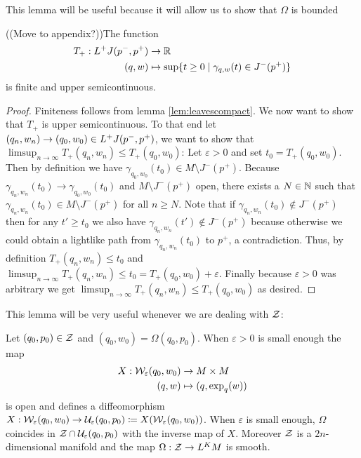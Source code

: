 This lemma will be useful because it will allow us to show that $\Omega$ is bounded
\begin{lemma}\label{lem:Tprop}
    ((Move to appendix?))The function
    \begin{align*}
        T_+:L^+J(p^-,p^+)&\to \mathbb{R} \\
        (q,w)&\mapsto \sup \{ t\ge 0 \mid \gamma_{q,w}(t)\in J^-(p^+)\}
    \end{align*}
    is finite and upper semicontinuous.
\end{lemma}
\begin{proof}
    Finiteness follows from lemma \ref{lem:leavescompact}. We now want to show that $T_+$ is upper semicontinuous. To that end let $(q_n,w_n)\to (q_0,w_0)\in L^+J(p^-,p^+)$, we want to show that $\limsup_{n\to \infty} T_+(q_n,w_n) \leq T_+(q_0,w_0)$: Let $\varepsilon>0$ and set $t_0 = T_+(q_0,w_0)$. Then by definition we have $\gamma_{q_0,w_0}(t_0)\in M \setminus J^-(p^+)$. Because $\gamma_{q_n,w_n}(t_0) \to \gamma_{q_0,w_0}(t_0)$ and $M \setminus J^-(p^+)$ open, there exists a $N\in \mathbb{N}$ such that $\gamma_{q_n,w_n}(t_0)\in M \setminus J^-(p^+)$ for all $n\ge N$. Note that if $\gamma_{q_n,w_n}(t_0)\notin J^-(p^+)$ then for any $t'\ge t_0$ we also have $\gamma_{q_n,w_n}(t') \notin J^-(p^+)$ because otherwise we could obtain a lightlike path from $\gamma_{q_n,w_n}(t_0)$ to $p^+$, a contradiction. Thus, by definition $T_+(q_n,w_n)\leq t_0$ and 
    $\limsup_{n\to \infty} T_+(q_n,w_n) \leq t_0 = T_+(q_0,w_0)+\varepsilon$. Finally because $\varepsilon>0$ was arbitrary we get $\limsup_{n\to \infty} T_+(q_n,w_n) \leq T_+(q_0,w_0)$ as desired.
\end{proof}

This lemma will be very useful whenever we are dealing with ${\mathcal{Z}}$:
\begin{lemma}\label{lem:omegacoords}
Let $(q_0,p_0)\in {\mathcal{Z}}$ and $(q_0,w_0)=\Omega(q_0,p_0)$. When $\varepsilon>0$ is small enough the map 
\begin{align*}
    X:{\mathcal{W}}_\varepsilon(q_0,w_0) &\to M\times M\\
    (q,w) &\mapsto (q,\exp_q(w))
\end{align*}
is open and defines a diffeomorphism $X:{\mathcal{W}}_\varepsilon(q_0,w_0)\to \mathcal{U}_\varepsilon(q_0,p_0) \coloneqq X({\mathcal{W}}_\varepsilon(q_0,w_0))$. When $\varepsilon$ is small enough, $\Omega$ coincides in ${\mathcal{Z}}\cap \mathcal{U}_\varepsilon(q_0,p_0)$ with the inverse map of $X$. Moreover ${\mathcal{Z}}$ is a $2n$-dimensional manifold and the map $\Omega:{\mathcal{Z}}\to L^KM$ is smooth.
\end{lemma}

